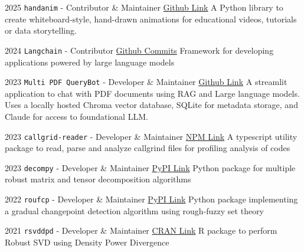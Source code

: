 \documentclass[10pt]{developercv} %
\begin{document}
\begin{entrylist}
    \vspace{-10pt}
    \entry
    {2025}
    {\texttt{handanim} - Contributor \& Maintainer}
    {\href{https://github.com/subroy13/handanim}{Github Link}}
    {\small A Python library to create whiteboard-style, hand-drawn animations for educational videos, tutorials or data storytelling.}
    
    \vspace*{-5pt}
    \entry
    {2024}
    {\texttt{Langchain} - Contributor}
    {\href{https://github.com/langchain-ai/langchain/commits?author=subroy13}{Github Commits}}
    {\small Framework for developing applications powered by large language models}
    
    \vspace*{-5pt}
    \entry
    {2023}
    {\texttt{Multi PDF QueryBot} - Developer \& Maintainer}
    {\href{https://github.com/subroy13/multi-pdf-querybot}{Github Link}}
    {\small A streamlit application to chat with PDF documents using RAG and Large language models. Uses a locally hosted Chroma vector database, SQLite for metadata storage, and Claude for access to foundational LLM.}
    
    \vspace*{-5pt}
    \entry
    {2023}
    {\texttt{callgrid-reader} - Developer \& Maintainer}
    {\href{https://www.npmjs.com/package/callgrind-reader}{NPM Link}}
    {\small A typescript utility package to read, parse and analyze callgrind files for profiling analysis of codes}
    
    \vspace*{-5pt}
    \entry
    {2023}
    {\texttt{decompy} - Developer \& Maintainer}
    {\href{https://pypi.org/project/decompy/}{PyPI Link}}
    {\small Python package for multiple robust matrix and tensor decomposition algorithms}

    \vspace*{-5pt}
    \entry
    {2022}
    {\texttt{roufcp} - Developer \& Maintainer}
    {\href{https://pypi.org/project/roufcp/}{PyPI Link}}
    {\small Python package implementing a gradual changepoint detection algorithm using rough-fuzzy set theory}
    
    \vspace*{-5pt}
    \entry
    {2021}
    {\texttt{rsvddpd} - Developer \& Maintainer}
    {\href{https://cran.r-project.org/web/packages/rsvddpd/index.html}{CRAN Link}}
    {\small R package to perform Robust SVD using Density Power Divergence}


\end{entrylist}
\end{document}
